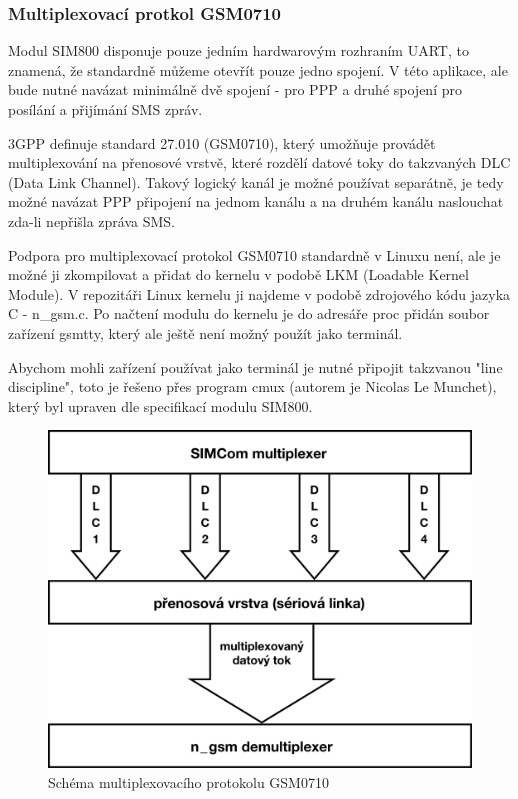 \subsubsection{Multiplexovací protkol GSM0710}
Modul SIM800 disponuje pouze jedním hardwarovým rozhraním UART, to znamená, že standardně můžeme otevřít pouze jedno spojení. V této aplikace, ale bude nutné navázat minimálně dvě spojení - pro PPP a druhé spojení pro posílání a přijímání SMS zpráv. 

3GPP definuje standard 27.010 (GSM0710), který umožňuje provádět multiplexování na přenosové vrstvě, které rozdělí datové toky do takzvaných DLC (Data Link Channel). Takový logický kanál je možné používat separátně, je tedy možné navázat PPP připojení na jednom kanálu a na druhém kanálu naslouchat zda-li nepřišla zpráva SMS.

Podpora pro multiplexovací protokol GSM0710 standardně v Linuxu není, ale je možné ji zkompilovat a přidat do kernelu v podobě LKM (Loadable Kernel Module). V repozitáři Linux kernelu ji najdeme v podobě zdrojového kódu jazyka C - n\_gsm.c. Po načtení modulu do kernelu je do adresáře proc přidán soubor zařízení gsmtty, který ale ještě není možný použít jako terminál.

Abychom mohli zařízení používat jako terminál je nutné připojit takzvanou "line discipline", toto je řešeno přes program cmux (autorem je Nicolas Le Munchet), který byl upraven dle specifikací modulu SIM800.

\begin{figure}[!h]
  \begin{center}
    \includegraphics[scale=0.3]{obrazky/simcom.png}
  \end{center}
  \caption{Schéma multiplexovacího protokolu GSM0710}
\end{figure}

